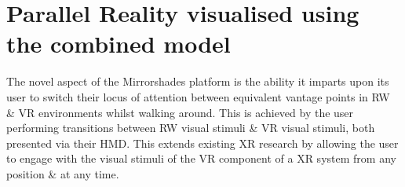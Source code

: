 


\section{Parallel Reality visualised using the combined model}

\newcommand{\breakinpresencefootnote}{\footnote{The definition of \textbf{break in presence} adopted herein is the second from Waterworth \& Waterworth~\cite{Waterworth2001} (p205): a movement along the focus axis away from presence in the real or a virtual environment \& toward absence. This differs to Slater \& Steed's original definition in~\cite{Slater2000} as they considered presence only in terms of attending to stimuli from a virtual environment, with a break in presence as a Gestalt switch to instead attending to stimuli from the real environment. Waterworth \& Waterworth's model considers presence in terms of attending to stimuli from either the real \textit{or a virtual} environment, with a break in presence representing absence in the sense of heightened conceptual load \& the resultant reduced perceptual processing of environmental stimuli originating from \textit{either} the real or a virtual environment. This definition better fits the situation invoked by the Mirrorshades platform, which is concerned with intentionally \& willingly switching engagement between stimuli from both real \& virtual environments, rather than engaging with stimuli from only a virtual environment in a scenario where stimuli from the real environment are considered a `distraction'.}}

The novel aspect of the Mirrorshades platform is the ability it imparts upon its user to switch their locus of attention between equivalent vantage points in RW \& VR environments whilst walking around. This is achieved by the user performing transitions between RW visual stimuli \& VR visual stimuli, both presented via their HMD. This extends existing XR research by allowing the user to engage with the visual stimuli of the VR component of a XR system from any position \& at any time.


